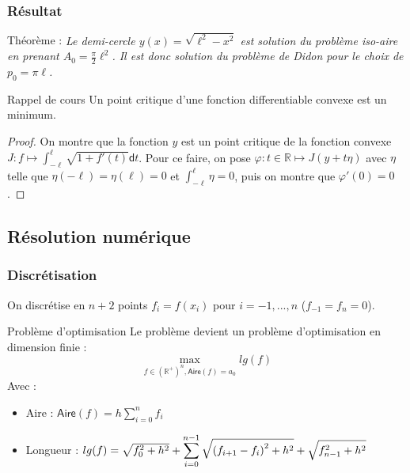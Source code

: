 \documentclass[11pt,envcountsect,aspectratio=169]{beamer} %
\newcommand{\R}{\mathbb{R}}
\renewcommand{\d}{\mathsf{d}}
\renewcommand{\phi}{\varphi}
\newcommand{\A}{\mathsf{Aire}}
\newcommand\thm[2]{%
    \begin{beamerboxesrounded}[upper=titreB,lower=texteB,shadow=true]{Théorème : #1}
        \it #2
    \end{beamerboxesrounded}
    \normalfont
}
\begin{document}
\begin{frame}
    \frametitle{Résultat}

    \thm{}{%
        Le demi-cercle $y(x)=\sqrt{\ell^2-x^2}$ est solution du problème iso-aire en prenant $A_0=\frac{\pi}{2}\ell^2$. Il est donc solution du problème de Didon pour le choix de $p_0=\pi\ell$.
    }

    \begin{beamerboxesrounded}[upper=titreV,lower=texteV,shadow=true]{Rappel de cours}
        Un point critique d'une fonction differentiable convexe est un minimum.
    \end{beamerboxesrounded}



    \begin{proof}
    On montre que la fonction $y$ est un point critique de la fonction convexe $J\colon f\mapsto \int_{-\ell}^\ell \sqrt{1+f'(t)}\d t$.
    Pour ce faire, on pose $\phi\colon t\in\R\mapsto J(y+t\eta)$ avec $\eta$ telle que $\eta(-\ell)=\eta(\ell)=0$ et $\int_{-\ell}^\ell \eta=0$, puis on montre que $\phi'(0)=0$.
    \end{proof}

\end{frame}





\subsection{Résolution numérique}

\begin{frame}
    \frametitle{Discrétisation}

    On discrétise en $n+2$ points $f_i = f(x_i)$ pour $i=-1,...,n$ ($f_{-1}=f_n=0$).

    \begin{beamerboxesrounded}[upper=titreB,lower=texteB,shadow=true]{Problème d'optimisation}
        Le problème devient un problème d'optimisation en dimension finie :
        \[\max_{f \in \left(\R^+\right)^n, \A(f)=a_0} lg(f)\]
        Avec :
        \begin{itemize}
            \item Aire : $\A(f) = h \sum_{i=0}^n{f_i}$
            \item Longueur : $lg(f) =  \sqrt{f_0^2+h^2} + \displaystyle\sum_{i=0}^{n-1}{\sqrt{\vphantom{f_n^2}{(f_{i+1}-f_i)}^2+h^2}} + \sqrt{f_{n-1}^2+h^2} $
        \end{itemize}
    \end{beamerboxesrounded}

\end{frame}
\end{document}
